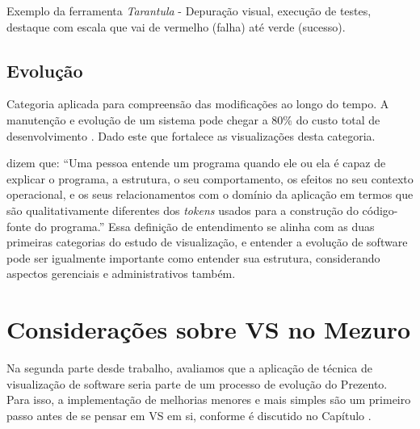 Exemplo da ferramenta \textit{Tarantula} \cite{jones2002visualization} -
Depuração visual, execução de testes, destaque com escala que vai de vermelho
(falha) até verde (sucesso).

\subsection{Evolução}

Categoria aplicada para compreensão das modificações ao longo do tempo. A
manutenção e evolução de um sistema pode chegar a 80\% do custo total de
desenvolvimento \cite{pfleeger2005analyzing}. Dado este que fortalece as
visualizações desta categoria.

 dizem que: ``Uma pessoa entende um programa
quando ele ou ela é capaz de explicar o programa, a estrutura, o seu
comportamento, os efeitos no seu contexto operacional, e os seus relacionamentos
com o domínio da aplicação em termos que são qualitativamente diferentes dos
\textit{tokens} usados para a construção do código-fonte do programa.'' Essa
definição de entendimento se alinha com as duas primeiras categorias do estudo
de visualização, e entender a evolução de software pode ser igualmente
importante como entender sua estrutura, considerando aspectos gerenciais e
administrativos também.

\section{Considerações sobre VS no Mezuro}

Na segunda parte desde trabalho, avaliamos que a aplicação de técnica de
visualização de software seria parte de um processo de evolução do Prezento.
Para isso, a  implementação de melhorias menores e mais simples são um primeiro
passo antes de se pensar em VS em si, conforme é discutido no Capítulo
\label{chap:proposta}.
